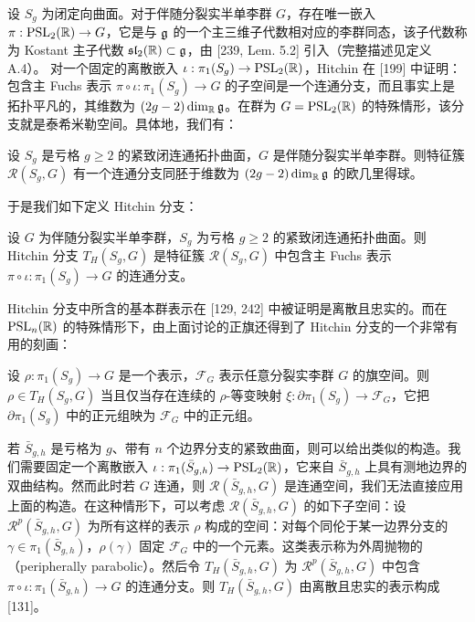 设 $S_g$ 为闭定向曲面。对于伴随分裂实半单李群 $G$，存在唯一嵌入 $\pi:\operatorname{PSL}_2(\mathbb{R})\to G$，它是与 $\mathfrak{g}$ 的一个主三维子代数相对应的李群同态，该子代数称为 Kostant 主子代数 $\mathfrak{sl}_2(\mathbb{R})\subset\mathfrak{g}$，由 [239, Lem. 5.2] 引入（完整描述见定义 A.4）。
对一个固定的离散嵌入 $\iota:\pi_1(S_g)\to\operatorname{PSL}_2(\mathbb{R})$，Hitchin 在 [199] 中证明：包含主 Fuchs 表示 $\pi\circ\iota:\pi_1(S_g)\to G$ 的子空间是一个连通分支，而且事实上是拓扑平凡的，其维数为 $(2g-2)\dim_{\mathbb{R}}\mathfrak{g}$。在群为 $G=\operatorname{PSL}_2(\mathbb{R})$ 的特殊情形，该分支就是泰希米勒空间。具体地，我们有：

\begin{theorem}[10.1] [199, Thm. A] 设 $S_g$ 是亏格 $g\ge2$ 的紧致闭连通拓扑曲面，$G$ 是伴随分裂实半单李群。则特征簇 $\mathcal{R}(S_g,G)$ 有一个连通分支同胚于维数为 $(2g-2)\dim_{\mathbb{R}}\mathfrak{g}$ 的欧几里得球。
\end{theorem}

于是我们如下定义 Hitchin 分支：

\begin{definition}[10.2] 设 $G$ 为伴随分裂实半单李群，$S_g$ 为亏格 $g\ge2$ 的紧致闭连通拓扑曲面。则 Hitchin 分支 $T_H(S_g,G)$ 是特征簇 $\mathcal{R}(S_g,G)$ 中包含主 Fuchs 表示 $\pi\circ\iota:\pi_1(S_g)\to G$ 的连通分支。
\end{definition}

Hitchin 分支中所含的基本群表示在 [129, 242] 中被证明是离散且忠实的。而在 $\operatorname{PSL}_n(\mathbb{R})$ 的特殊情形下，由上面讨论的正旗还得到了 Hitchin 分支的一个非常有用的刻画：

\begin{theorem}[10.3] [129, 175, 242] 设 $\rho:\pi_1(S_g)\to G$ 是一个表示，$\mathcal{F}_G$ 表示任意分裂实李群 $G$ 的旗空间。则 $\rho\in T_H(S_g,G)$ 当且仅当存在连续的 $\rho$-等变映射 $\xi:\partial\pi_1(S_g)\to\mathcal{F}_G$，它把 $\partial\pi_1(S_g)$ 中的正元组映为 $\mathcal{F}_G$ 中的正元组。
\end{theorem}

\begin{remark}[10.4] 若 $\bar S_{g,h}$ 是亏格为 $g$、带有 $n$ 个边界分支的紧致曲面，则可以给出类似的构造。我们需要固定一个离散嵌入 $\iota:\pi_1(\bar S_{g,h})\to\operatorname{PSL}_2(\mathbb{R})$，它来自 $\bar S_{g,h}$ 上具有测地边界的双曲结构。然而此时若 $G$ 连通，则 $\mathcal{R}(\bar S_{g,h},G)$ 是连通空间，我们无法直接应用上面的构造。在这种情形下，可以考虑 $\mathcal{R}(\bar S_{g,h},G)$ 的如下子空间：设 $\mathcal{R}^p(\bar S_{g,h},G)$ 为所有这样的表示
$\rho$ 构成的空间：对每个同伦于某一边界分支的 $\gamma\in\pi_1(\bar S_{g,h})$，$\rho(\gamma)$ 固定 $\mathcal{F}_G$ 中的一个元素。这类表示称为外周抛物的（peripherally parabolic）。然后令 $T_H(\bar S_{g,h},G)$ 为 $\mathcal{R}^p(\bar S_{g,h},G)$ 中包含 $\pi\circ\iota:\pi_1(\bar S_{g,h})\to G$ 的连通分支。则 $T_H(\bar S_{g,h},G)$ 由离散且忠实的表示构成 [131]。
\end{remark}

